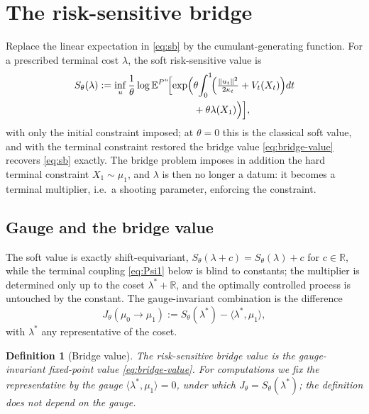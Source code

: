 \documentclass[letterpaper,10pt,conference]{IEEEtran}
\newtheorem{definition}{Definition}
\newcommand{\EE}{\mathbb{E}}
\newcommand{\RR}{\mathbb{R}}
\begin{document}
	\section{The risk-sensitive bridge}
	\label{sec:rsb}
	
	Replace the linear expectation in \eqref{eq:sb} by the cumulant-generating
	function. For a prescribed terminal cost $\lambda$, the {soft}
	risk-sensitive value is
	\begin{equation}
		\label{eq:rs-obj}
		\begin{split}
			S_\theta(\lambda):=\inf_{u}\frac{1}{\theta}
			\log\EE^{P^u}\!\Bigl[\exp\Bigl(&\theta\!\int_0^1\!\Bigl(\tfrac{\|u_t\|^2}{2\kappa_t}+V_t(X_t)\Bigr)dt\\
			&+\theta\lambda(X_1)\Bigr)\Bigr],
		\end{split}
	\end{equation}
	with only the initial constraint imposed; at $\theta=0$ this is the classical
	soft value, and with the terminal constraint restored the bridge value
	\eqref{eq:bridge-value} recovers \eqref{eq:sb} exactly. The {bridge} problem imposes in addition the hard terminal
	constraint $X_1\sim\mu_1$, and $\lambda$ is then no longer a datum: it becomes a
	{terminal multiplier}, i.e.\ a shooting parameter, enforcing the constraint.
	
	\subsection{Gauge and the bridge value}
	The soft value is exactly shift-equivariant,
	$S_\theta(\lambda+c)=S_\theta(\lambda)+c$ for $c\in\RR$, while the terminal coupling
	\eqref{eq:Psi1} below is blind to constants; the multiplier is determined only
	up to the coset $\lambda^*+\RR$, and the optimally controlled process is
	untouched by the constant. The gauge-invariant combination is the difference
	\begin{equation}
		\label{eq:bridge-value}
		J_\theta(\mu_0\to\mu_1):=S_\theta(\lambda^*)-\langle\lambda^*,\mu_1\rangle,
	\end{equation}
	with $\lambda^*$ any representative of the coset.
	
	\begin{definition}[Bridge value]
		\label{def:bridge-value}
		The {risk-sensitive bridge value} is the gauge-invariant fixed-point
		value \eqref{eq:bridge-value}. For computations we fix the representative by
		the gauge $\langle\lambda^*,\mu_1\rangle=0$, under which
		$J_\theta=S_\theta(\lambda^*)$; the definition does not depend on the gauge.
	\end{definition}
	
\end{document}
